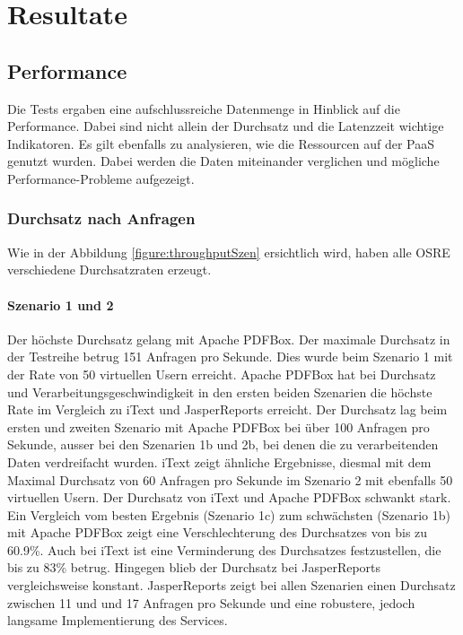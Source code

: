 \documentclass[main.tex]{subfiles}
\begin{document}
\chapter{Resultate} 

\section{Performance}
Die Tests ergaben eine aufschlussreiche Datenmenge in Hinblick auf die Performance. Dabei sind nicht allein der Durchsatz und die Latenzzeit wichtige Indikatoren. Es gilt ebenfalls zu analysieren, wie die Ressourcen auf der PaaS genutzt wurden. Dabei werden die Daten miteinander verglichen und mögliche Performance-Probleme aufgezeigt. 



\subsection{Durchsatz nach Anfragen}
Wie in der Abbildung \ref{figure:throughputSzen} ersichtlich wird, haben alle OSRE verschiedene Durchsatzraten erzeugt.

\subsubsection{Szenario 1 und 2}
Der höchste Durchsatz gelang mit Apache PDFBox. Der maximale Durchsatz in der Testreihe betrug 151 Anfragen pro Sekunde. Dies wurde beim Szenario 1 mit der Rate von 50 virtuellen Usern erreicht.  Apache PDFBox hat bei Durchsatz und Verarbeitungsgeschwindigkeit in den ersten beiden Szenarien die höchste Rate im Vergleich zu iText und JasperReports erreicht. 
Der Durchsatz lag beim ersten und zweiten Szenario mit Apache PDFBox bei über 100 Anfragen pro Sekunde, ausser bei den Szenarien 1b und 2b, bei denen die zu verarbeitenden Daten verdreifacht wurden. 
iText zeigt ähnliche Ergebnisse, diesmal mit dem Maximal Durchsatz von 60 Anfragen pro Sekunde im Szenario 2 mit ebenfalls 50 virtuellen Usern. Der Durchsatz von iText und Apache PDFBox schwankt stark. Ein Vergleich vom besten Ergebnis (Szenario 1c) zum schwächsten (Szenario 1b) mit Apache PDFBox zeigt eine Verschlechterung des Durchsatzes von bis zu 60.9\%. Auch bei iText ist eine Verminderung des Durchsatzes festzustellen, die  bis zu 83\% betrug. Hingegen blieb der Durchsatz bei JasperReports vergleichsweise konstant. JasperReports zeigt bei allen Szenarien einen Durchsatz zwischen 11 und und 17 Anfragen pro Sekunde und eine robustere, jedoch langsame Implementierung des Services.
\end{document}
